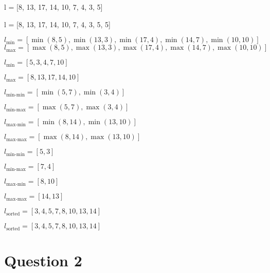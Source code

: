 \documentclass{article}
\begin{document}
\begin{center}

l = [8, 13, 17, 14, 10, 7, 4, 3, 5]

l = [8, 13, 17, 14, 10, 7, 4, 3, 5, 5]

$l_{\text{min}} = [\min(8, 5), \min(13, 3), \min(17, 4), \min(14, 7), \min(10, 10)]$
$l_{\text{max}} = [\max(8, 5), \max(13, 3), \max(17, 4), \max(14, 7), \max(10, 10)]$

$l_{\text{min}} = [5, 3, 4, 7, 10]$\par
$l_{\text{max}} = [8, 13, 17, 14, 10]$\par


$l_{\text{min-min}} = [\min(5, 7), \min(3, 4)]$\par
$l_{\text{min-max}} = [\max(5, 7), \max(3, 4)]$\par
$l_{\text{max-min}} = [\min(8, 14), \min(13, 10)]$\par
$l_{\text{max-max}} = [\max(8, 14), \max(13, 10)]$\par

$l_{\text{min-min}} = [5, 3]$\par
$l_{\text{min-max}} = [7, 4]$\par
$l_{\text{max-min}} = [8, 10]$\par
$l_{\text{max-max}} = [14, 13]$\par

$l_{\text{sorted}} = [3, 4, 5, 7, 8, 10, 13, 14]$

$l_{\text{sorted}} = [3, 4, 5, 7, 8, 10, 13, 14]$
\end{center}

\section{Question 2}
\end{document}
